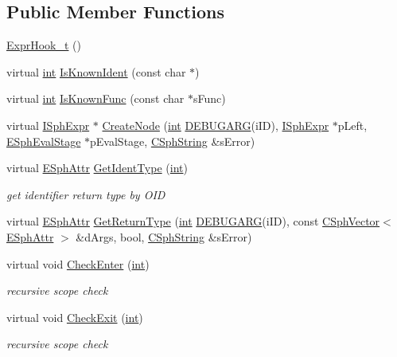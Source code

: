 \subsection*{Public Member Functions}
\begin{DoxyCompactItemize}
\item 
\hyperlink{structExprHook__t_a7c58377ff19a1bbebbeb4f73ce1b2b9d}{Expr\-Hook\-\_\-t} ()
\item 
virtual \hyperlink{sphinxexpr_8cpp_a4a26e8f9cb8b736e0c4cbf4d16de985e}{int} \hyperlink{structExprHook__t_a830a1512b0eebdbc1c720e126944b0ed}{Is\-Known\-Ident} (const char $\ast$)
\item 
virtual \hyperlink{sphinxexpr_8cpp_a4a26e8f9cb8b736e0c4cbf4d16de985e}{int} \hyperlink{structExprHook__t_aada2e31944c7b48f524b356f9db4fdc0}{Is\-Known\-Func} (const char $\ast$s\-Func)
\item 
virtual \hyperlink{structISphExpr}{I\-Sph\-Expr} $\ast$ \hyperlink{structExprHook__t_a8c22efdc23d08d959d53bbb41a07127b}{Create\-Node} (\hyperlink{sphinxexpr_8cpp_a4a26e8f9cb8b736e0c4cbf4d16de985e}{int} \hyperlink{sphinxstd_8h_aea24330ad33ca20415a6729b2e46ef2d}{D\-E\-B\-U\-G\-A\-R\-G}(i\-I\-D), \hyperlink{structISphExpr}{I\-Sph\-Expr} $\ast$p\-Left, \hyperlink{sphinxexpr_8h_ae5eb5e13e926842882703cd0bd53ee46}{E\-Sph\-Eval\-Stage} $\ast$p\-Eval\-Stage, \hyperlink{structCSphString}{C\-Sph\-String} \&s\-Error)
\item 
virtual \hyperlink{sphinxexpr_8h_aa883df0db2e4468a107fdd2d2ae625a3}{E\-Sph\-Attr} \hyperlink{structExprHook__t_a0dcb50ca421a9b070ad55040a42fbb41}{Get\-Ident\-Type} (\hyperlink{sphinxexpr_8cpp_a4a26e8f9cb8b736e0c4cbf4d16de985e}{int})
\begin{DoxyCompactList}\small\item\em get identifier return type by O\-I\-D \end{DoxyCompactList}\item 
virtual \hyperlink{sphinxexpr_8h_aa883df0db2e4468a107fdd2d2ae625a3}{E\-Sph\-Attr} \hyperlink{structExprHook__t_a42ef64d8ed6021093b67301a51363ae8}{Get\-Return\-Type} (\hyperlink{sphinxexpr_8cpp_a4a26e8f9cb8b736e0c4cbf4d16de985e}{int} \hyperlink{sphinxstd_8h_aea24330ad33ca20415a6729b2e46ef2d}{D\-E\-B\-U\-G\-A\-R\-G}(i\-I\-D), const \hyperlink{classCSphVector}{C\-Sph\-Vector}$<$ \hyperlink{sphinxexpr_8h_aa883df0db2e4468a107fdd2d2ae625a3}{E\-Sph\-Attr} $>$ \&d\-Args, bool, \hyperlink{structCSphString}{C\-Sph\-String} \&s\-Error)
\item 
virtual void \hyperlink{structExprHook__t_ad08801db467712f7f89b21ca8e3d8b10}{Check\-Enter} (\hyperlink{sphinxexpr_8cpp_a4a26e8f9cb8b736e0c4cbf4d16de985e}{int})
\begin{DoxyCompactList}\small\item\em recursive scope check \end{DoxyCompactList}\item 
virtual void \hyperlink{structExprHook__t_acd7dbedd52e4be519cb3921c30d9b07a}{Check\-Exit} (\hyperlink{sphinxexpr_8cpp_a4a26e8f9cb8b736e0c4cbf4d16de985e}{int})
\begin{DoxyCompactList}\small\item\em recursive scope check \end{DoxyCompactList}\end{DoxyCompactItemize}
